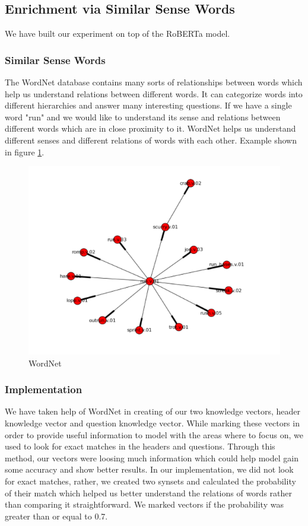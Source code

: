 \documentclass[12pt]{article}
\begin{document}
 
\subsection{Enrichment via Similar Sense Words}
We have built our experiment on top of the RoBERTa model. 

\subsubsection{Similar Sense Words}
The WordNet database contains many sorts of relationships between words which help us understand relations between different words. It can categorize words into different hierarchies and answer many interesting questions. If we have a single word "run" and we would like to understand its sense and relations between different words which are in close proximity to it. WordNet helps us understand different senses and different relations of words with each other. Example shown in figure \ref{wordnet}.


\begin{figure}[H]
    \includegraphics[width=400pt]{wordnet}
    \caption{WordNet}
    \label{wordnet}
\end{figure}

\subsubsection{Implementation}
We have taken help of WordNet in creating of our two knowledge vectors, header knowledge vector and question knowledge vector. While marking these vectors in order to provide useful information to model with the areas where to focus on, we used to look for exact matches in the headers and questions. Through this method, our vectors were loosing much information which could help model gain some accuracy and show better results. In our implementation, we did not look for exact matches, rather, we created two synsets and calculated the probability of their match which helped us better understand the relations of words rather than comparing it straightforward. We marked vectors if the probability was greater than or equal to 0.7. 
\end{document}
